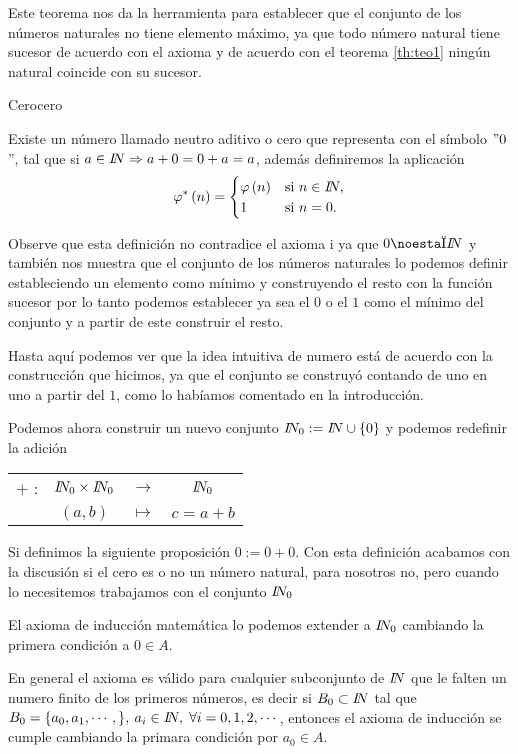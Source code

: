 Este teorema nos da la herramienta para establecer que el conjunto
de los números naturales no tiene elemento máximo, ya que todo número
natural tiene sucesor de acuerdo con el axioma  y de acuerdo
con el teorema \ref{th:teo1} ningún natural coincide con su sucesor.

\begin{defi}{Cero}{cero} 

Existe un número llamado neutro aditivo o cero que representa con
el símbolo $"0$'', tal que si $a\in\na\Rightarrow a+0=0+a=a$, además
definiremos la aplicación 
\[
\varphi^{*}\left(n\right)=\begin{cases}
\varphi\left(n\right) & \mbox{si \ensuremath{n\in\na,}}\\
1 & \mbox{si \ensuremath{n=0.}}
\end{cases}
\]

\end{defi}

Observe que esta definición no contradice el axioma i
ya que $0\notin\na$ y también nos muestra que el conjunto de los
números naturales lo podemos definir estableciendo un elemento como
mínimo y construyendo el resto con la función sucesor por lo tanto
podemos establecer ya sea el $0$ o el $1$ como el mínimo del conjunto
y a partir de este construir el resto.

Hasta aquí podemos ver que la idea intuitiva de numero está de acuerdo
con la construcción que hicimos, ya que el conjunto se construyó contando
de uno en uno a partir del $1$, como lo habíamos comentado en la
introducción.

\begin{apunte} 

Podemos ahora construir un nuevo conjunto $\na_{0}:=\na\cup\left\{ 0\right\} $
y podemos redefinir la adición 

\begin{center}
\begin{tabular}{cccc}
$+$ : &
$\na_{0}\times\na_{0}$ &
$\rightarrow$ &
$\na_{0}$\tabularnewline
 &
$\left(a,b\right)$ &
$\mapsto$ &
$c=a+b$\tabularnewline
\end{tabular}
\par\end{center}

Si definimos la siguiente proposición $0:=0+0$. Con esta definición
acabamos con la discusión si el cero es o no un número natural, para
nosotros no, pero cuando lo necesitemos trabajamos con el conjunto
$\na_{0}$ 

El axioma de inducción matemática lo podemos extender a $\na_{0}$
cambiando la primera condición a $0\in A.$ 

En general el axioma es válido para cualquier subconjunto de $\text{\na\ }$que
le falten un numero finito de los primeros números, es decir si $B_{0}\subset\na$
tal que $B_{0}=\{a_{0},a_{1},\cdots,\},\:a_{i}\in\na,\;\forall i=0,1,2,\cdots$,
entonces el axioma de inducción se cumple cambiando la primara condición
por $a_{0}\in A.$

\end{apunte}

